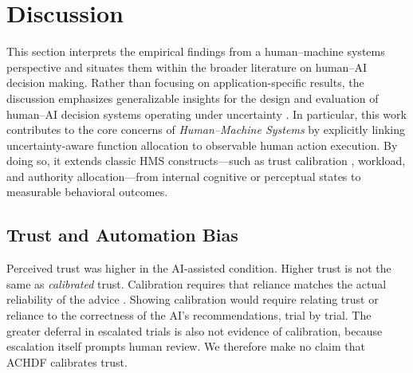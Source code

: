 \documentclass[journal]{IEEEtran}
\theoremstyle{plain}
\theoremstyle{definition}
\providecommand{\DIFaddtex}[1]{{\protect\color{blue} \sf #1}} %
\providecommand{\DIFdeltex}[1]{{\protect\color{red} \scriptsize #1}} %
\providecommand{\DIFaddbegin}{} %
\providecommand{\DIFaddend}{} %
\providecommand{\DIFdelbegin}{} %
\providecommand{\DIFdelend}{} %
\providecommand{\DIFadd}[1]{\texorpdfstring{\DIFaddtex{#1}}{#1}} %
\providecommand{\DIFdel}[1]{\texorpdfstring{\DIFdeltex{#1}}{}} %
\newcommand{\DIFscaledelfig}{0.5}
\newlength{\DIFdelgraphicswidth} %
\newlength{\DIFdelgraphicsheight} %
\newcommand{\DIFaddincludegraphics}[2][]{{\color{blue}\fbox{\DIFOincludegraphics[#1]{#2}}}} %
\newcommand{\DIFdelincludegraphics}[2][]{%
\sbox{\DIFdelgraphicsbox}{\DIFOincludegraphics[#1]{#2}}%
\settoboxwidth{\DIFdelgraphicswidth}{\DIFdelgraphicsbox} %
\settoboxtotalheight{\DIFdelgraphicsheight}{\DIFdelgraphicsbox} %
\scalebox{\DIFscaledelfig}{%
\parbox[b]{\DIFdelgraphicswidth}{\usebox{\DIFdelgraphicsbox}\\[-\baselineskip] \rule{\DIFdelgraphicswidth}{0em}}\llap{\resizebox{\DIFdelgraphicswidth}{\DIFdelgraphicsheight}{%
\setlength{\unitlength}{\DIFdelgraphicswidth}%
\begin{picture}(1,1)%
\thicklines\linethickness{2pt} %
{\color[rgb]{1,0,0}\put(0,0){\framebox(1,1){}}}%
{\color[rgb]{1,0,0}\put(0,0){\line( 1,1){1}}}%
{\color[rgb]{1,0,0}\put(0,1){\line(1,-1){1}}}%
\end{picture}%
}\hspace*{3pt}}} %
} %
\DeclareRobustCommand{\DIFaddbegin}{\DIFOaddbegin \let\includegraphics\DIFaddincludegraphics} %
\DeclareRobustCommand{\DIFaddend}{\DIFOaddend \let\includegraphics\DIFOincludegraphics} %
\DeclareRobustCommand{\DIFdelbegin}{\DIFOdelbegin \let\includegraphics\DIFdelincludegraphics} %
\DeclareRobustCommand{\DIFdelend}{\DIFOaddend \let\includegraphics\DIFOincludegraphics} %
\begin{document}
\DIFdelbegin \section{\DIFdel{Discussion}}
\addtocounter{section}{-1}%
\DIFdel{This section interprets the empirical findings from a human--machine systems perspective and situates them within the broader literature on human--AI decision making. Rather than focusing on application-specific results, the discussion emphasizes generalizable insights for the design and evaluation of human--AI decision systems operating under uncertainty \cite{Bach2024Access,PerezCerrolaza2024CSUR,Lai2023FAccT,Yang2022THMSReview}. In particular, this work contributes to the core concerns of \textit{Human--Machine Systems} by explicitly linking uncertainty-aware function allocation to observable human action execution. By doing so, it extends classic HMS constructs---such as trust calibration , workload, and authority allocation---from internal cognitive or perceptual states to measurable behavioral outcomes. }\DIFdelend \DIFaddbegin \subsection{\DIFadd{Trust and Automation Bias}}
\DIFadd{Perceived trust was higher in the AI-assisted condition. Higher trust is not the same as \emph{calibrated} trust. Calibration requires that reliance matches the actual reliability of the advice \cite{Lee2004}. Showing calibration would require relating trust or reliance to the correctness of the AI's recommendations, trial by trial. The greater deferral in escalated trials is also not evidence of calibration, because escalation itself prompts human review. We therefore make no claim that ACHDF calibrates trust.
}\DIFaddend 
\end{document}
